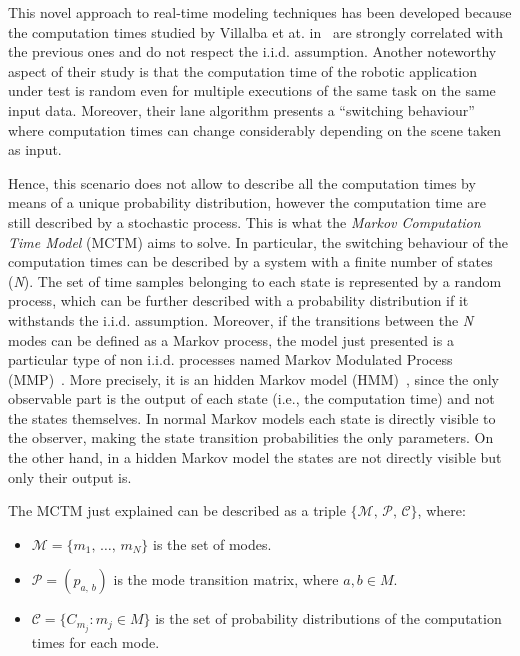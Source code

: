 This novel approach to real-time modeling techniques has been developed because the
computation times studied by Villalba et at. in~\cite{villalba2017probabilistic}
are strongly correlated with the previous ones and do not respect the i.i.d.
assumption. Another noteworthy aspect of their study is that the
computation time of the robotic application under test is random even for multiple
executions of the same task on the same input data.
Moreover, their lane algorithm presents a ``switching behaviour'' where computation
times can change considerably depending on the scene taken as input.

Hence, this scenario does not allow to describe all the computation times by means
of a unique probability distribution, however the computation time are still described
by a stochastic process. This is what the \emph{Markov Computation Time Model}
(MCTM) aims to solve. In particular, the switching behaviour of the
computation times can be described by a system with a finite number of states
(\emph{N}). The set of time samples belonging to each state is represented
by a random process, which can be further described with a probability
distribution if it withstands the i.i.d. assumption.
Moreover, if the transitions between the \emph{N} modes can be defined as a Markov
process, the model just presented is a particular type of non i.i.d. processes
named Markov Modulated Process (MMP)~\cite{fischer1993markov}.
More precisely, it is an hidden Markov model (HMM)~\cite{eddy1996hidden}, since
the only observable part is the output of each state (i.e., the computation time)
and not the states themselves. In normal Markov models each
state is directly visible to the observer, making the state transition probabilities
the only parameters. On the other hand, in a hidden Markov model the states are
not directly visible but only their output is.

The MCTM just explained can be described as a triple \(\{\mathcal{M},\,\mathcal{P},\,\mathcal{C}\}\), where:
\begin{itemize}
    \item \( \mathcal{M} = \{ m_1,\,\dots,\,m_N \} \) is the set of modes.
    \item \( \mathcal{P} = (p_{a,\,b}) \) is the mode transition matrix, where
        \(a, b \in M\).
    \item \( \mathcal{C} = \{ C_{m_j} : m_j \in M \} \) is the set of probability
        distributions of the computation times for each mode.
\end{itemize}

